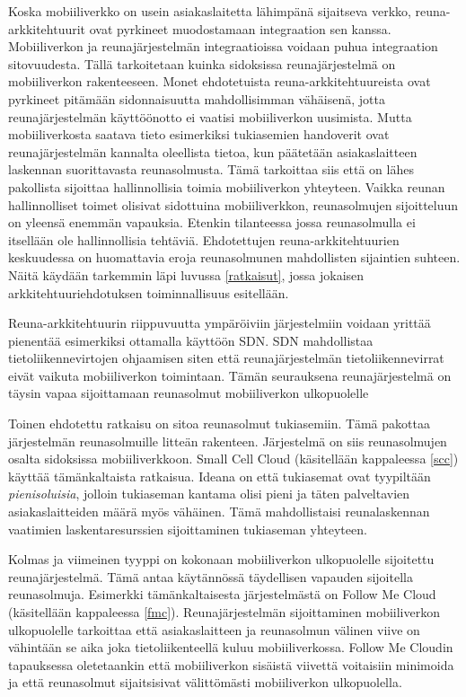 Koska mobiiliverkko on usein asiakaslaitetta lähimpänä sijaitseva verkko, reuna-arkkitehtuurit ovat pyrkineet muodostamaan integraation sen kanssa.
Mobiiliverkon ja reunajärjestelmän integraatioissa voidaan puhua integraation sitovuudesta. 
Tällä tarkoitetaan kuinka sidoksissa reunajärjestelmä on mobiiliverkon rakenteeseen.
Monet ehdotetuista reuna-arkkitehtuureista ovat pyrkineet pitämään sidonnaisuutta mahdollisimman vähäisenä, jotta reunajärjestelmän käyttöönotto ei vaatisi mobiiliverkon uusimista.
Mutta mobiiliverkosta saatava tieto esimerkiksi tukiasemien handoverit ovat reunajärjestelmän kannalta oleellista tietoa, kun päätetään asiakaslaitteen laskennan suorittavasta reunasolmusta.
Tämä tarkoittaa siis että on lähes pakollista sijoittaa hallinnollisia toimia mobiiliverkon yhteyteen.
Vaikka reunan hallinnolliset toimet olisivat sidottuina mobiiliverkkon, reunasolmujen sijoitteluun on yleensä enemmän vapauksia. Etenkin tilanteessa jossa reunasolmulla ei itsellään ole hallinnollisia tehtäviä.
Ehdotettujen reuna-arkkitehtuurien keskuudessa on huomattavia eroja reunasolmunen mahdollisten sijaintien suhteen. Näitä käydään tarkemmin läpi luvussa \ref{ratkaisut}, jossa jokaisen arkkitehtuuriehdotuksen toiminnallisuus esitellään. 

Reuna-arkkitehtuurin riippuvuutta ympäröiviin järjestelmiin voidaan yrittää pienentää esimerkiksi ottamalla käyttöön SDN. SDN mahdollistaa tietoliikennevirtojen ohjaamisen siten että reunajärjestelmän tietoliikennevirrat eivät vaikuta mobiiliverkon toimintaan. Tämän seurauksena reunajärjestelmä on täysin vapaa sijoittamaan reunasolmut mobiiliverkon ulkopuolelle

Toinen ehdotettu ratkaisu on sitoa reunasolmut tukiasemiin. Tämä pakottaa järjestelmän reunasolmuille litteän rakenteen. Järjestelmä on siis reunasolmujen osalta sidoksissa mobiiliverkkoon. Small Cell Cloud (käsitellään kappaleessa \ref{scc}) käyttää tämänkaltaista ratkaisua. Ideana on että tukiasemat ovat tyypiltään \textit{pienisoluisia}, jolloin tukiaseman kantama olisi pieni ja täten palveltavien asiakaslaitteiden määrä myös vähäinen. Tämä mahdollistaisi reunalaskennan vaatimien laskentaresurssien sijoittaminen tukiaseman yhteyteen.

Kolmas ja viimeinen tyyppi on kokonaan mobiiliverkon ulkopuolelle sijoitettu reunajärjestelmä. Tämä antaa käytännössä täydellisen vapauden sijoitella reunasolmuja. Esimerkki tämänkaltaisesta järjestelmästä on Follow Me Cloud (käsitellään kappaleessa \ref{fmc}). Reunajärjestelmän sijoittaminen mobiiliverkon ulkopuolelle tarkoittaa että asiakaslaitteen ja reunasolmun välinen viive on vähintään se aika joka tietoliikenteellä kuluu mobiiliverkossa. Follow Me Cloudin tapauksessa oletetaankin että mobiiliverkon sisäistä viivettä voitaisiin minimoida ja että reunasolmut sijaitsisivat välittömästi mobiiliverkon ulkopuolella. 
















